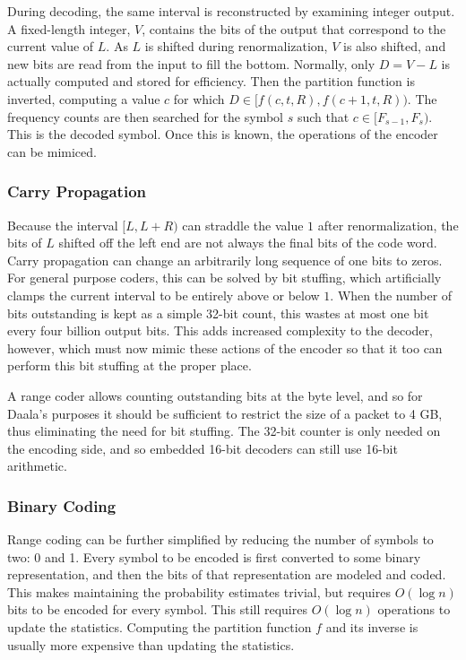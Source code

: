 \documentclass[11pt,letterpaper]{article}
\begin{document}
During decoding, the same interval is reconstructed by examining integer
 output.
A fixed-length integer, $V$, contains the bits of the output that correspond to
 the current value of $L$.
As $L$ is shifted during renormalization, $V$ is also shifted, and new bits are
 read from the input to fill the bottom.
Normally, only $D=V-L$ is actually computed and stored for efficiency.
Then the partition function is inverted, computing a value $c$ for which
 $D\in[f(c,t,R),f(c+1,t,R))$.
The frequency counts are then searched for the symbol $s$ such that
 $c\in[F_{s-1},F_s)$.
This is the decoded symbol.
Once this is known, the operations of the encoder can be mimiced.

\subsubsection{Carry Propagation}

Because the interval $[L,L+R)$ can straddle the value $1$ after
 renormalization, the bits of $L$ shifted off the left end are not always the
 final bits of the code word.
Carry propagation can change an arbitrarily long sequence of one bits to zeros.
For general purpose coders, this can be solved by bit stuffing, which
 artificially clamps the current interval to be entirely above or below $1$.
When the number of bits outstanding is kept as a simple 32-bit count, this
 wastes at most one bit every four billion output bits.
This adds increased complexity to the decoder, however, which must now mimic
 these actions of the encoder so that it too can perform this bit stuffing at
 the proper place.

A range coder allows counting outstanding bits at the byte level, and so for
 Daala's purposes it should be sufficient to restrict the size of a packet to
 4 GB, thus eliminating the need for bit stuffing.
The 32-bit counter is only needed on the encoding side, and so embedded 16-bit
 decoders can still use 16-bit arithmetic.

\subsubsection{Binary Coding}

Range coding can be further simplified by reducing the number of symbols to
 two: 0 and 1.
Every symbol to be encoded is first converted to some binary representation,
 and then the bits of that representation are modeled and coded.
This makes maintaining the probability estimates trivial, but requires
 $O(\log n)$ bits to be encoded for every symbol.
This still requires $O(\log n)$ operations to update the statistics.
Computing the partition function $f$ and its inverse is usually more expensive
 than updating the statistics.
\end{document}
